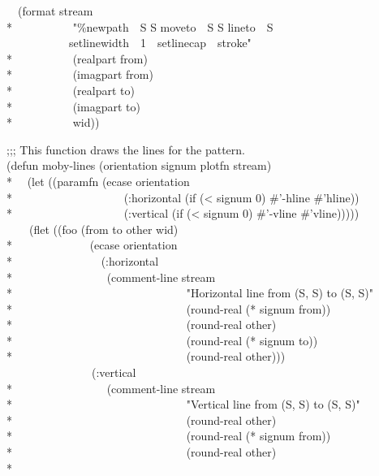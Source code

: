 \begin{new}
\begin{lisp}
~~(format stream \\*
~~~~~~~~~~"{\Xtilde}\%newpath~~{\Xtilde}S {\Xtilde}S moveto~~{\Xtilde}S {\Xtilde}S lineto~~{\Xtilde}S {\Xtilde} \\
~~~~~~~~~~~setlinewidth~~1~~setlinecap~~stroke" \\*
~~~~~~~~~~(realpart from) \\*
~~~~~~~~~~(imagpart from) \\*
~~~~~~~~~~(realpart to) \\*
~~~~~~~~~~(imagpart to) \\*
~~~~~~~~~~wid)) \\
\end{lisp}
\begin{lisp}
;;; This function draws the lines for the pattern. \\
(defun moby-lines (orientation signum plotfn stream) \\*
~~(let ((paramfn (ecase orientation \\*
~~~~~~~~~~~~~~~~~~~(:horizontal (if (< signum 0) \#'-hline \#'hline)) \\*
~~~~~~~~~~~~~~~~~~~(:vertical (if (< signum 0) \#'-vline \#'vline))))) \\
~~~~(flet ((foo (from to other wid) \\*
~~~~~~~~~~~~~(ecase orientation \\*
~~~~~~~~~~~~~~~(:horizontal \\*
~~~~~~~~~~~~~~~~(comment-line stream \\*
~~~~~~~~~~~~~~~~~~~~~~~~~~~~~~"Horizontal line from ({\Xtilde}S, {\Xtilde}S) to ({\Xtilde}S, {\Xtilde}S)" \\*
~~~~~~~~~~~~~~~~~~~~~~~~~~~~~~(round-real (* signum from)) \\*
~~~~~~~~~~~~~~~~~~~~~~~~~~~~~~(round-real other) \\*
~~~~~~~~~~~~~~~~~~~~~~~~~~~~~~(round-real (* signum to)) \\*
~~~~~~~~~~~~~~~~~~~~~~~~~~~~~~(round-real other))) \\
~~~~~~~~~~~~~~~(:vertical \\*
~~~~~~~~~~~~~~~~(comment-line stream \\*
~~~~~~~~~~~~~~~~~~~~~~~~~~~~~~"Vertical line from ({\Xtilde}S, {\Xtilde}S) to ({\Xtilde}S, {\Xtilde}S)" \\*
~~~~~~~~~~~~~~~~~~~~~~~~~~~~~~(round-real other) \\*
~~~~~~~~~~~~~~~~~~~~~~~~~~~~~~(round-real (* signum from)) \\*
~~~~~~~~~~~~~~~~~~~~~~~~~~~~~~(round-real other) \\*

\end{lisp}
\end{new}
